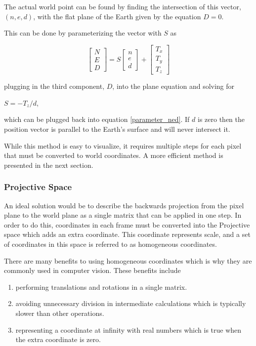  The actual world point can be found by finding the intersection of this vector, $(n,e,d)$, with the flat plane of the Earth given by the equation $D=0$.  
 
 This can be done by parameterizing the vector with $S$ as 
 
 \begin{equation}
 \label{parameter_ned}
 \begin{bmatrix} N \\ E \\ D \end{bmatrix} =
 S \begin{bmatrix} n \\ e \\ d \end{bmatrix}
 + \begin{bmatrix} T_x \\ T_y \\ T_z \end{bmatrix}
 \end{equation}
 
 plugging in the third component, $D$, into the plane equation and solving for
 \begin{center}
 $S = -T_z / d$, 
 \end{center}
 which can be plugged back into equation \ref{parameter_ned}.  If $d$ is zero then the position vector is parallel to the Earth's surface and will never intersect it.   

 While this method is easy to visualize, it requires multiple steps for each pixel that must be converted to world coordinates.  A more efficient method is presented in the next section.

 \subsubsection{Projective Space}
 
 An ideal solution would be to describe the backwards projection from the pixel plane to the world plane as a single matrix that can be applied in one step.  In order to do this, coordinates in each frame must be converted into the Projective space which adds an extra coordinate.  This coordinate represents scale, and a set of coordinates in this space is referred to as homogeneous coordinates.

 There are many benefits to using homogeneous coordinates which is why they are commonly used in computer vision.  These benefits include
 \begin{enumerate}
 \item performing translations and rotations in a single matrix.
 \item avoiding unnecessary division in intermediate calculations which is typically slower than other operations.
 \item representing a coordinate at infinity with real numbers which is true when the extra coordinate is zero.
 \end{enumerate}
 
